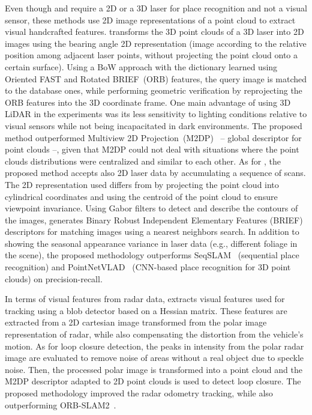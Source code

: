 Even though \cite{cao-et-al:2018:2815956} and \cite{cao-et-al:2021:2962416} require a 2D or a 3D laser for place recognition and not a visual sensor, these methods use 2D image representations of a point cloud to extract visual handcrafted features.
\cite{cao-et-al:2018:2815956} transforms the 3D point clouds of a 3D laser into 2D images using the bearing angle 2D representation (image according to the relative position among adjacent laser points, without projecting the point cloud onto a certain surface). Using a BoW approach with the dictionary learned using Oriented FAST and Rotated BRIEF~(ORB) features, the query image is matched to the database ones, while performing geometric verification by reprojecting the ORB features into the 3D coordinate frame. One main advantage of using 3D LiDAR in the experiments was its less sensitivity to lighting conditions relative to visual sensors while not being incapacitated in dark environments. The proposed method outperformed Multiview 2D Projection~(M2DP)~\parencite{discussion:m2dp} -- global descriptor for point clouds --, given that M2DP could not deal with situations where the point clouds distributions were centralized and similar to each other.
As for \cite{cao-et-al:2021:2962416}, the proposed method accepts also 2D laser data by accumulating a sequence of scans. The 2D representation used differs from \cite{cao-et-al:2018:2815956} by projecting the point cloud into cylindrical coordinates and using the centroid of the point cloud to ensure viewpoint invariance.
Using Gabor filters to detect and describe the contours of the images, \cite{cao-et-al:2021:2962416} generates Binary Robust Independent Elementary Features (BRIEF) descriptors for matching images using a nearest neighbors search. In addition to showing the seasonal appearance variance in laser data (e.g., different foliage in the scene), the proposed methodology outperforms SeqSLAM~\parencite{discussion:seqslam} (sequential place recognition) and PointNetVLAD~\parencite{discussion:pointnetvlad} (CNN-based place recognition for 3D point clouds) on precision-recall.

In terms of visual features from radar data, \cite{hong-et-al:2022:02783649221080483} extracts visual features used for tracking using a blob detector based on a Hessian matrix. These features are extracted from a 2D cartesian image transformed from the polar image representation of radar, while also compensating the distortion from the vehicle's motion.
As for loop closure detection, the peaks in intensity from the polar radar image are evaluated to remove noise of areas without a real object due to speckle noise. Then, the processed polar image is transformed into a point cloud and the M2DP descriptor adapted to 2D point clouds is used to detect loop closure.
The proposed methodology improved the radar odometry tracking, while also outperforming ORB-SLAM2~\parencite{discussion:orb-slam2}.


